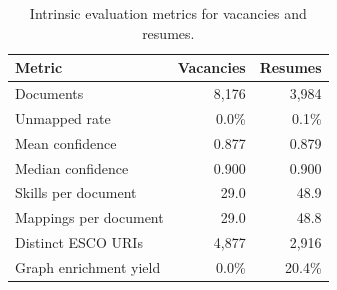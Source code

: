\begin{table}[htbp]
  \centering
  \caption{Intrinsic evaluation metrics for vacancies and resumes.}
  \label{tab:intrinsic}
  \begin{tabular}{lrr}
    \toprule
    Metric & Vacancies & Resumes \\
    \midrule
  Documents & 8{,}176 & 3{,}984 \\
  Unmapped rate & 0.0\% & 0.1\% \\
  Mean confidence & 0.877 & 0.879 \\
  Median confidence & 0.900 & 0.900 \\
  Skills per document & 29.0 & 48.9 \\
  Mappings per document & 29.0 & 48.8 \\
  Distinct ESCO URIs & 4{,}877 & 2{,}916 \\
  Graph enrichment yield & 0.0\% & 20.4\% \\
    \bottomrule
  \end{tabular}
\end{table}
